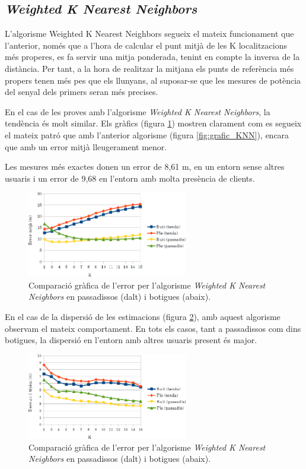 \subsection{\textit{Weighted K Nearest Neighbors}}

L'algorisme Weighted K Nearest Neighbors segueix el mateix funcionament que l'anterior, només que a l'hora de calcular el punt mitjà de les K localitzacions més properes, es fa servir una mitja ponderada, tenint en compte la inversa de la distància. Per tant, a la hora de realitzar la mitjana els punts de referència més propers tenen més pes que els llunyans, al suposar-se que les mesures de potència del senyal dels primers seran més precises.

En el cas de les proves amb l'algorisme \textit{Weighted K Nearest Neighbors}, la tendència és molt similar. Els gràfics (figura \ref{fig:grafic_mitja_WKNN}) mostren clarament com es segueix el mateix patró que amb l'anterior algorisme (figura \ref{fig:grafic_KNN}), encara que amb un error mitjà lleugerament menor.

Les mesures més exactes donen un error de 8,61 m, en un entorn sense altres usuaris i un error de 9,68 en l'entorn amb molta presència de clients.

\begin{figure}[ht]
\begin{center}
\includegraphics[width=7cm]{imatges/wknn_mitja.png}
\caption{Comparació gràfica de l'error per l'algorisme \textit{Weighted K Nearest Neighbors} en passadissos (dalt) i botigues (abaix).}
\label{fig:grafic_mitja_WKNN}
\end{center}
\end{figure}

En el cas de la dispersió de les estimacions (figura \ref{fig:grafic_desviacio_WKNN}), amb aquest algorisme observam el mateix comportament. En tots els casos, tant a passadissos com dins botigues, la dispersió en l'entorn amb altres usuaris present és major. 

\begin{figure}[ht]
\begin{center}
\includegraphics[width=7cm]{imatges/wknn_desviacio.png}
\caption{Comparació gràfica de l'error per l'algorisme \textit{Weighted K Nearest Neighbors} en passadissos (dalt) i botigues (abaix).}
\label{fig:grafic_desviacio_WKNN}
\end{center}
\end{figure}

